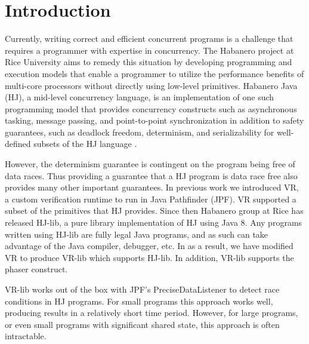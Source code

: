 \section{Introduction}

Currently, writing correct and efficient concurrent programs is a challenge
that requires a programmer with expertise in concurrency. The Habanero project
at Rice University aims to remedy this situation by developing programming and
execution models that enable a programmer to utilize the performance benefits
of multi-core processors without directly using low-level primitives. Habanero
Java (HJ), a mid-level concurrency language, is an implementation of
one such programming model that
provides concurrency constructs such as asynchronous tasking, message passing,
and point-to-point synchronization in addition to safety guarantees, such as
deadlock freedom, determinism, and serializability for well-defined subsets of
the HJ language \cite{Cave:2011:HNA:2093157.2093165}.

However, the determinism guarantee is contingent on the program being free of
data races. Thus providing a guarantee that a HJ program is data race free also
provides many other important guarantees. In previous
work\cite{Anderson:2014:JVH:2557833.2560582} we introduced VR, a custom
verification runtime to run in Java Pathfinder (JPF). VR supported a subset of
the primitives that HJ provides. Since then Habanero group at Rice has released
HJ-lib, a pure library implementation of HJ using Java 8. Any programs written using HJ-lib
are fully legal Java programs, and as such can take advantage of the Java
compiler, debugger, etc. In as a result, we have modified VR to produce VR-lib
which supports HJ-lib. In addition, VR-lib supports the phaser construct.

VR-lib works out of the box with JPF's PreciseDataListener to detect race
conditions in HJ programs. For small programs this approach works well,
producing results in a relatively short time period. However, for large
programs, or even small programs with significant shared state, this approach is
often intractable.

